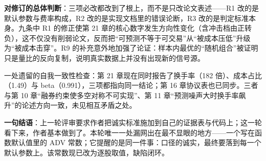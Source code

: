 \documentclass[11pt,a4paper]{ctexart}
\begin{document}
\textbf{对修订的总体判断}：三项必改都改到了根上，而不是只改论文表述——R1 改的是默认参数与费率构成，R2 改的是实现文档里的错误论断，R3 改的是判定标准本身。九条中 R1 的修正使第 21 章的核心数字发生方向性变化（含冲击档由正转负），这不仅没有削弱论文，反而把“可预测不等于可交易”从“被成本压低”升级为“被成本击穿”。R9 的补充意外地加强了论证：样本内最优的“随机组合”被证明只是量比的反向复制，说明真实数据上并没有出现新的信号源。

一处遗留的自我一致性检查：第 21 章现在同时报告了换手率（182 倍）、成本占比（1.49）与 beta（0.991），三项都指向同一结论；第 16 章协议表也已同步。三者与第 10 章“融券约束使多空对称不可实现”、第 11 章“预测噪声大时换手率飙升”的论述方向一致，未见相互矛盾之处。

\medskip

\noindent\textbf{一句结语}：上一轮评审要求作者把诚实标准施加到自己的证据表与代码上；这一轮看下来，作者基本做到了。本轮唯一一处漏网出在最不显眼的地方——一个写在函数默认值里的 ADV 常数；它提醒的是同一件事：口径的诚实，最终要落到每一个默认参数上。该常数现已改为逐股取值，缺陷闭环。
\end{document}
